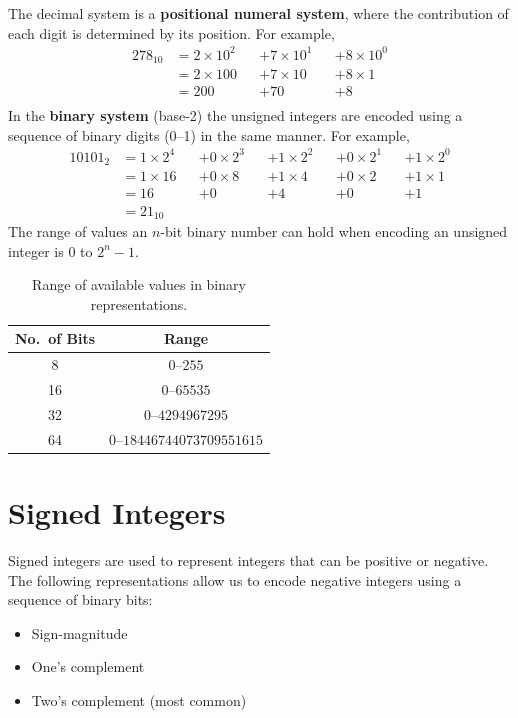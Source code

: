 \documentclass{report}
\begin{document}
The decimal system is a \textbf{positional numeral system}, where the contribution of each digit is determined by its position.
For example,
\begin{align*}
    278_{10} & = 2 \times 10^2 &  & + 7 \times 10^1 &  & + 8 \times 10^0 \\
             & = 2 \times 100  &  & + 7 \times 10   &  & + 8 \times 1    \\
             & = 200           &  & + 70            &  & + 8             \\
\end{align*}
In the \textbf{binary system} (base-2) the unsigned integers are encoded using a sequence of binary digits (0--1)
in the same manner. For example,
\begin{align*}
    10101_2 & = 1 \times 2^4 &  & + 0 \times 2^3 &  & + 1 \times 2^2 &  & + 0 \times 2^1 &  & + 1 \times 2^0 \\
            & = 1 \times 16  &  & + 0 \times 8   &  & + 1 \times 4   &  & + 0 \times 2   &  & + 1 \times 1   \\
            & = 16           &  & + 0            &  & + 4            &  & + 0            &  & + 1            \\
            & = 21_{10}
\end{align*}
The range of values an \(n\)-bit binary number can hold when encoding an unsigned integer is 0 to \(2^n - 1\).
\begin{table}[H]
    \centering
    \begin{tabular}{c c}
        \toprule
        \textbf{No.\ of Bits} & \textbf{Range}                        \\
        \midrule
        8                     & \(0\)--\(255\)                        \\
        16                    & \(0\)--\(\num{65535}\)                \\
        32                    & \(0\)--\(\num{4294967295}\)           \\
        64                    & \(0\)--\(\num{18446744073709551615}\) \\
        \bottomrule
    \end{tabular}
    \caption{Range of available values in binary representations.} %
\end{table}
\section{Signed Integers}
Signed integers are used to represent integers that can be positive or negative.
The following representations allow us to encode negative integers using a sequence of binary bits:
\begin{itemize}
    \item Sign-magnitude
    \item One's complement
    \item Two's complement (most common)
\end{itemize}
\end{document}
